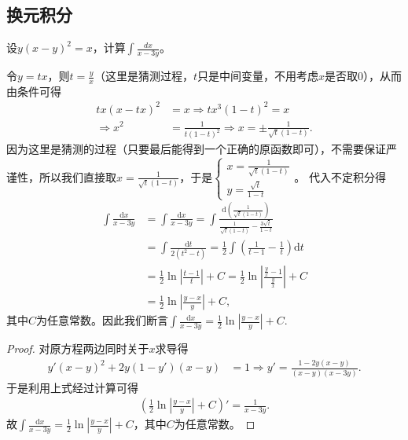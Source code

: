 \documentclass[../../main.tex]{subfiles}
\begin{document}
\subsection{换元积分}

\begin{example}
设\(y(x - y)^2 = x\)，计算\(\int \frac{dx}{x - 3y}\)。 
\end{example}
\begin{note}
令\(y = tx\)，则\(t = \frac{y}{x}\)（这里是猜测过程，\(t\)只是中间变量，不用考虑\(x\)是否取\(0\)），从而由条件可得
\begin{align*}
tx(x - tx)^2 &= x \Rightarrow tx^3(1 - t)^2 = x\\
\Rightarrow x^2&=\frac{1}{t(1 - t)^2} \Rightarrow x = \pm\frac{1}{\sqrt{t}(1 - t)}.
\end{align*}
因为这里是猜测的过程（只要最后能得到一个正确的原函数即可），不需要保证严谨性，所以我们直接取\(x=\frac{1}{\sqrt{t}(1 - t)}\)，于是\(\begin{cases}
x=\frac{1}{\sqrt{t}(1 - t)}\\
y=\frac{\sqrt{t}}{1 - t}
\end{cases}\)。
代入不定积分得
\begin{align*}
\int{\frac{\mathrm{d}x}{x - 3y}}&=\int{\frac{\mathrm{d}x}{x - 3y}}=\int{\frac{\mathrm{d}\left(\frac{1}{\sqrt{t}(1 - t)}\right)}{\frac{1}{\sqrt{t}(1 - t)}-\frac{3\sqrt{t}}{1 - t}}}\\
&=\int{\frac{\mathrm{d}t}{2(t^2 - t)}}=\frac{1}{2}\int{\left(\frac{1}{t - 1}-\frac{1}{t}\right)\mathrm{d}t}\\
&=\frac{1}{2}\ln\left|\frac{t - 1}{t}\right| + C=\frac{1}{2}\ln\left|\frac{\frac{y}{x}-1}{\frac{y}{x}}\right| + C\\
&=\frac{1}{2}\ln\left|\frac{y - x}{y}\right| + C,
\end{align*}
其中\(C\)为任意常数。因此我们断言\(\int{\frac{\mathrm{d}x}{x - 3y}}=\frac{1}{2}\ln\left|\frac{y - x}{y}\right| + C\).
\end{note}
\begin{proof}
对原方程两边同时关于\(x\)求导得
\begin{align*}
y'(x - y)^2 + 2y(1 - y')(x - y) &= 1 \Rightarrow y'=\frac{1 - 2y(x - y)}{(x - y)(x - 3y)}.
\end{align*}
于是利用上式经过计算可得
\begin{align*}
\left(\frac{1}{2}\ln\left|\frac{y - x}{y}\right| + C\right)'=\frac{1}{x - 3y}.
\end{align*}
故\(\int{\frac{\mathrm{d}x}{x - 3y}}=\frac{1}{2}\ln\left|\frac{y - x}{y}\right| + C\)，其中\(C\)为任意常数。 
\end{proof}
\end{document}
